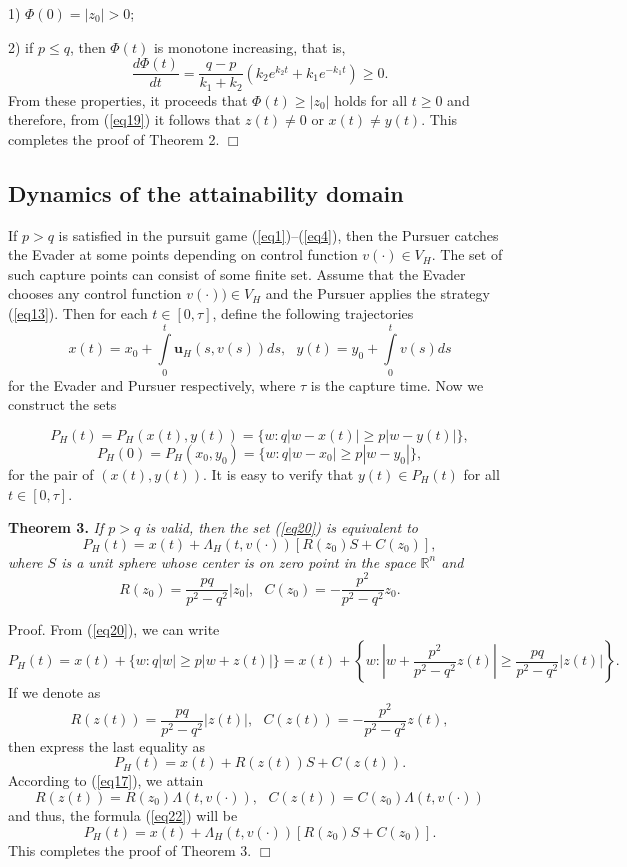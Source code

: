 \documentclass[10 pt]{book}
\begin{document}
1) $\Phi(0)=|z_{0}|>0$;

2) if $p\leq q$, then $\Phi(t)$ is monotone increasing, that is,  $$\frac{d\Phi(t)}{dt}=\frac{q-p}{k_{1}+k_{2}}(k_{2}e^{k_{2}t}+k_{1}e^{-k_{1}t})\geq0.$$
From these properties, it proceeds that $\Phi(t)\geq|z_{0}|$ holds for all $t\geq0$ and therefore, from (\ref{eq19}) it follows that $z(t)\neq0$ or $x(t)\neq y(t)$.
This completes the proof of Theorem 2. \hfill$\Box$ \\

\subsection*{Dynamics of the attainability domain}
If $p > q$ is satisfied in the pursuit game (\ref{eq1})--(\ref{eq4}), then the Pursuer catches the Evader at some points depending on control function $v(\cdot)\in V_{H}$. The set of such capture points can consist of some finite set. Assume that the Evader
chooses any control function $v(\cdot))\in V_{H}$ and the Pursuer applies the strategy (\ref{eq13}). Then for each $t\in[0, \tau]$, define the following trajectories
$$ x(t)=x_0+\int\limits_0^t\textbf{u}_{H}(s,v(s))ds, \ \ \ y(t)=y_0+\int\limits_0^tv(s)ds $$
for the Evader and Pursuer respectively, where $\tau$ is the capture time. Now we construct the sets

\begin{equation} \label{eq20}
P_{H}(t)=P_{H}(x(t),y(t))=\{w:q|w-x(t)|\geq p|w-y(t)|\},
\end{equation}
$$P_{H}(0)=P_{H}(x_{0},y_{0})=\{w:q|w-x_{0}|\geq p|w-y_{0}|\},$$
for the pair of $(x(t),y(t))$. It is easy to verify that $y(t)\in P_{H}(t)$ for all $t\in[0,\tau]$.

\textbf{Theorem 3.} \emph{If $p > q$ is valid, then the set (\ref{eq20}) is equivalent to
\begin{equation} \label{eq21}
P_{H}(t)=x(t)+\Lambda_{H}(t,v(\cdot))[R(z_{0})S+C(z_{0})],
\end{equation}
where $S$ is a unit sphere whose center is on zero point in the space $\mathbb R^{n}$ and $$R(z_{0})=\frac{pq}{p^{2}-q^{2}}
|z_0|, \ \ \ C(z_{0})=-\frac{p^{2}}{p^{2}-q^{2}} z_0.$$}
\medskip

{\sf Proof. } From (\ref{eq20}), we can write
$$P_{H}(t)=x(t)+\{w:q|w|\geq p|w+z(t)|\}=x(t)+\left\{w:\left|w+\frac{p^{2}}{p^{2}-q^{2}}z(t)\right|\geq
\frac{pq}{p^{2}-q^{2}}|z(t)|\right\}.$$
If we denote as
$$R(z(t))=\frac{pq}{p^{2}-q^{2}}
|z(t)|, \ \ \ C(z(t))=-\frac{p^{2}}{p^{2}-q^{2}} z(t),$$
then express the last equality as
\begin{equation} \label{eq22}
P_{H}(t)=x(t)+R(z(t))S+C(z(t)).
\end{equation}
According to (\ref{eq17}), we attain
$$R(z(t))=R(z_{0})\Lambda(t, v(\cdot)), \ \ \ C(z(t))=C(z_{0})\Lambda(t, v(\cdot))$$
and thus, the formula (\ref{eq22}) will be
$$P_{H}(t)=x(t)+\Lambda_{H}(t,v(\cdot))[R(z_{0})S+C(z_{0})].$$
This completes the proof of Theorem 3. \hfill$\Box$ \\
\end{document}
